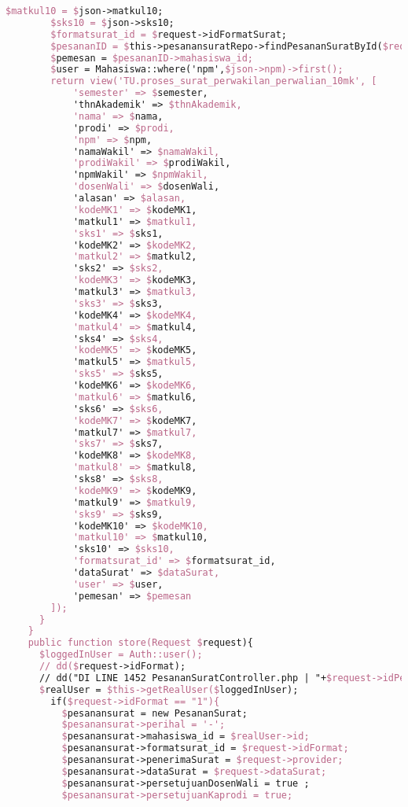 \begin{lstlisting}[language=tex,basicstyle=\tiny,caption=PesanansuratController.php]
        $matkul10 = $json->matkul10;
        $sks10 = $json->sks10;
        $formatsurat_id = $request->idFormatSurat;
        $pesananID = $this->pesanansuratRepo->findPesananSuratById($request->id);
        $pemesan = $pesananID->mahasiswa_id;
        $user = Mahasiswa::where('npm',$json->npm)->first();
        return view('TU.proses_surat_perwakilan_perwalian_10mk', [
            'semester' => $semester,
            'thnAkademik' => $thnAkademik,
            'nama' => $nama,
            'prodi' => $prodi,
            'npm' => $npm,
            'namaWakil' => $namaWakil,
            'prodiWakil' => $prodiWakil,
            'npmWakil' => $npmWakil,
            'dosenWali' => $dosenWali,
            'alasan' => $alasan,
            'kodeMK1' => $kodeMK1,
            'matkul1' => $matkul1,
            'sks1' => $sks1,
            'kodeMK2' => $kodeMK2,
            'matkul2' => $matkul2,
            'sks2' => $sks2,
            'kodeMK3' => $kodeMK3,
            'matkul3' => $matkul3,
            'sks3' => $sks3,
            'kodeMK4' => $kodeMK4,
            'matkul4' => $matkul4,
            'sks4' => $sks4,
            'kodeMK5' => $kodeMK5,
            'matkul5' => $matkul5,
            'sks5' => $sks5,
            'kodeMK6' => $kodeMK6,
            'matkul6' => $matkul6,
            'sks6' => $sks6,
            'kodeMK7' => $kodeMK7,
            'matkul7' => $matkul7,
            'sks7' => $sks7,
            'kodeMK8' => $kodeMK8,
            'matkul8' => $matkul8,
            'sks8' => $sks8,
            'kodeMK9' => $kodeMK9,
            'matkul9' => $matkul9,
            'sks9' => $sks9,
            'kodeMK10' => $kodeMK10,
            'matkul10' => $matkul10,
            'sks10' => $sks10,
            'formatsurat_id' => $formatsurat_id,
            'dataSurat' => $dataSurat,
            'user' => $user,
            'pemesan' => $pemesan
        ]);
      }
    }
    public function store(Request $request){
      $loggedInUser = Auth::user();
      // dd($request->idFormat);
      // dd("DI LINE 1452 PesananSuratController.php | "+$request->idPesanansurat);
      $realUser = $this->getRealUser($loggedInUser);
        if($request->idFormat == "1"){
          $pesanansurat = new PesananSurat;
          $pesanansurat->perihal = '-';
          $pesanansurat->mahasiswa_id = $realUser->id;
          $pesanansurat->formatsurat_id = $request->idFormat;
          $pesanansurat->penerimaSurat = $request->provider;
          $pesanansurat->dataSurat = $request->dataSurat;
          $pesanansurat->persetujuanDosenWali = true ;
          $pesanansurat->persetujuanKaprodi = true;

\end{lstlisting}
